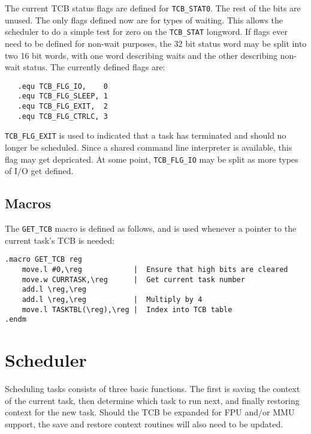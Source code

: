 \documentclass[10pt, openany]{book}
\begin{document}
The current TCB status flags are defined for \verb|TCB_STAT0|.  The rest of the bits are unused.  The only flags defined now are for types of waiting.  This allows the scheduler to do a simple test for zero on the \verb|TCB_STAT| longword.  If flags ever need to be defined for non-wait purposes, the 32 bit status word may be split into two 16 bit words, with one word describing waits and the other describing non-wait status.  The currently defined flags are:
\begin{lstlisting}
   .equ TCB_FLG_IO,    0
   .equ TCB_FLG_SLEEP, 1
   .equ TCB_FLG_EXIT,  2
   .equ TCB_FLG_CTRLC, 3
\end{lstlisting}
\verb|TCB_FLG_EXIT| is used to indicated that a task has terminated and should no longer be scheduled.  Since a shared command line interpreter is available, this flag may get depricated.  At some point, \verb|TCB_FLG_IO| may be split as more types of I/O get defined.

\subsection{Macros}

The \verb|GET_TCB| macro is defined as follows, and is used whenever a pointer to the current task's TCB is needed:
\begin{lstlisting}
.macro GET_TCB reg
    move.l #0,\reg            |  Ensure that high bits are cleared
    move.w CURRTASK,\reg      |  Get current task number
    add.l \reg,\reg
    add.l \reg,\reg           |  Multiply by 4
    move.l TASKTBL(\reg),\reg |  Index into TCB table
.endm
\end{lstlisting}

\section{Scheduler}
Scheduling tasks consists of three basic functions.  The first is saving the context of the current task, then determine which task to run next, and finally restoring context for the new task.  Should the TCB be expanded for FPU and/or MMU support, the save and restore context routines will also need to be updated.
\end{document}
